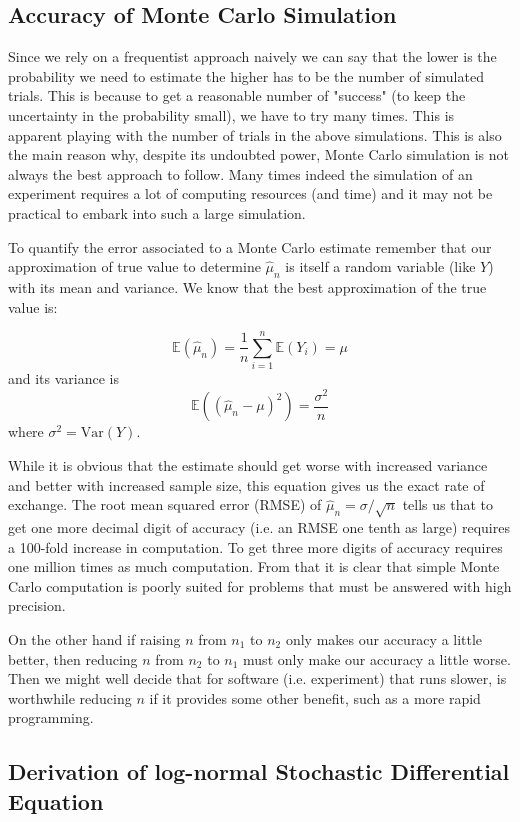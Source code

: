 \subsection{Accuracy of Monte Carlo Simulation}

Since we rely on a frequentist approach naively we can say that the lower is the probability we need to estimate the higher has to be the number of simulated trials. This is because to get a reasonable number of "success" (to keep the uncertainty in the probability small), we have to try many times. This is apparent playing with the number of trials in the above simulations. 
This is also the main reason why, despite its undoubted power, Monte Carlo simulation is not always the best approach to follow.
Many times indeed the simulation of an experiment requires a lot of computing resources (and time) and it may not be practical to embark into such a large simulation.

To quantify the error associated to a Monte Carlo estimate remember that our approximation of true value to determine $\hat{\mu}_n$ is itself a random variable (like $Y$) with its mean and variance. We know that the best approximation of the true value is:

\[\mathbb{E}(\hat{\mu}_n) = \frac{1}{n}\sum_{i=1}^{n}\mathbb{E}(Y_i)=\mu \]
and its variance is
\[\mathbb{E}((\hat{\mu}_n - \mu)^2)=\frac{\sigma^2}{n}\]
where $\sigma^2 = \mathrm{Var}(Y)$.

While it is obvious that the estimate should get worse with increased variance and better with increased sample size, this equation  gives us the exact rate of exchange. The root mean squared error (RMSE) of $\hat{\mu}_n = \sigma/\sqrt{n}$ tells us that to get one more decimal digit of accuracy (i.e. an RMSE one tenth as large) requires a 100-fold increase in computation. To get three more digits of accuracy requires one million times as much computation. From that it is clear that simple Monte Carlo computation is poorly suited for problems that must be answered with high precision.

On the other hand if raising $n$ from $n_1$ to $n_2$ only makes our accuracy a little better, then reducing $n$ from $n_2$ to $n_1$ must only make our accuracy a little worse. Then we might well decide that for software (i.e. experiment) that runs slower, is worthwhile reducing $n$ if it provides some other benefit, such as a more rapid programming.

 \subsection{Derivation of log-normal Stochastic Differential
Equation}\label{derivation-of-log-normal-stochastic-differential-equation}

